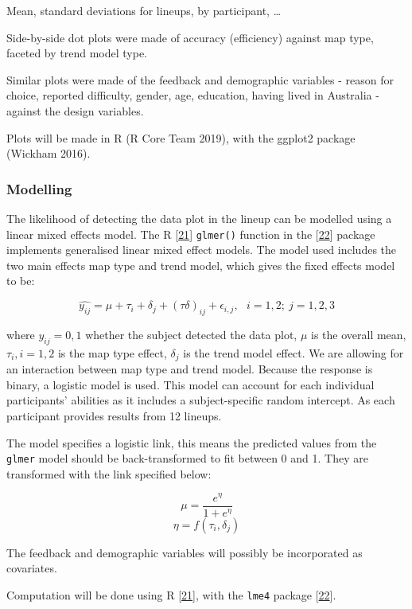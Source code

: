 \documentclass[conference,final,]{IEEEtran}
\begin{document}
Mean, standard deviations for lineups, by participant, \ldots{}

Side-by-side dot plots were made of accuracy (efficiency) against map type, faceted by trend model type.

Similar plots were made of the feedback and demographic variables - reason for choice, reported difficulty, gender, age, education, having lived in Australia - against the design variables.

Plots will be made in R (R Core Team 2019), with the ggplot2 package (Wickham 2016).

\hypertarget{modelling}{%
\subsubsection{Modelling}\label{modelling}}

The likelihood of detecting the data plot in the lineup can be modelled using a linear mixed effects model.
The R {[}\protect\hyperlink{ref-RCore}{21}{]} \texttt{glmer()} function in the {[}\protect\hyperlink{ref-lme4}{22}{]} package implements generalised linear mixed effect models. The model used includes the two main effects map type and trend model, which gives the fixed effects model to be:

\[\widehat{y_{ij}} = \mu + \tau_i + \delta_j + (\tau\delta)_{ij} + \epsilon_{i,j}, ~~~ i=1,2; ~j=1,2,3\]

where \(y_{ij} = 0, 1\) whether the subject detected the data plot, \(\mu\) is the overall mean, \(\tau_i, i=1,2\) is the map type effect, \(\delta_j\) is the trend model effect. We are allowing for an interaction between map type and trend model. Because the response is binary, a logistic model is used. This model can account for each individual participants' abilities as it includes a subject-specific random intercept. As each participant provides results from 12 lineups.

The model specifies a logistic link, this means the predicted values from the \texttt{glmer} model should be back-transformed to fit between 0 and 1. They are transformed with the link specified below:

\[\mu = \frac{e^{\eta}}{1 + e^{\eta}}\] \label{eq:transform}
\[\eta = f(\tau_i,\delta_j)\]

The feedback and demographic variables will possibly be incorporated as covariates.

Computation will be done using R {[}\protect\hyperlink{ref-RCore}{21}{]}, with the \texttt{lme4} package {[}\protect\hyperlink{ref-lme4}{22}{]}.
\end{document}
